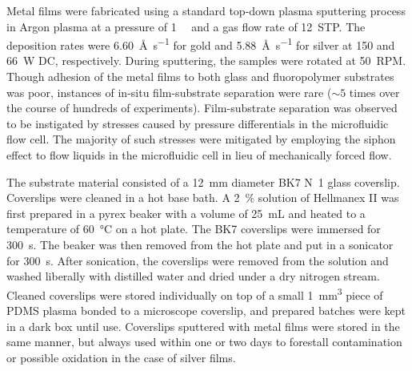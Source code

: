 Metal films were fabricated using a standard top-down plasma sputtering process
in Argon plasma at a pressure of \SI{1}{\milli\torr} and a gas flow rate of
\SI{12}{STP}.  The deposition rates were \SI{6.60}{\angstrom\per\second} for
gold and \SI{5.88}{\angstrom\per\second} for silver at 150 and \SI{66}{\watt}
DC, respectively.  During sputtering, the samples were rotated at \SI{50}{RPM}.
Though adhesion of the metal films to both glass and fluoropolymer substrates
was poor, instances of in-situ film-substrate separation were rare ($\sim5$
times over the course of hundreds of experiments).  Film-substrate separation
was observed to be instigated by stresses caused by pressure differentials in
the microfluidic flow cell.  The majority of such stresses were mitigated by
employing the siphon effect to flow liquids in the microfluidic cell in lieu of
mechanically forced flow.


The substrate material consisted of a \SI{12}{\milli\meter} diameter BK7
N~1 glass coverslip.  Coverslips were
cleaned in a hot base bath.  A \SI{2}{\percent} solution of Hellmanex II was
first prepared in a pyrex beaker with a volume of \SI{25}{\milli\liter} and
heated to a temperature of \SI{60}{\celsius} on a hot plate.  The BK7
coverslips were immersed for \SI{300}{\second}.  The beaker was then removed
from the hot plate and put in a sonicator for \SI{300}{\second}.  After
sonication, the coverslips were removed from the solution and washed liberally
with distilled water and dried under a dry nitrogen stream.  Cleaned
coverslips were stored individually on top of a small
\SI{1}{\milli\meter\cubed} piece of PDMS plasma bonded to a microscope
coverslip, and prepared batches were kept in a dark box until use.  Coverslips
sputtered with metal films were stored in the same manner, but always used
within one or two days to forestall contamination or possible oxidation in the
case of silver films.

